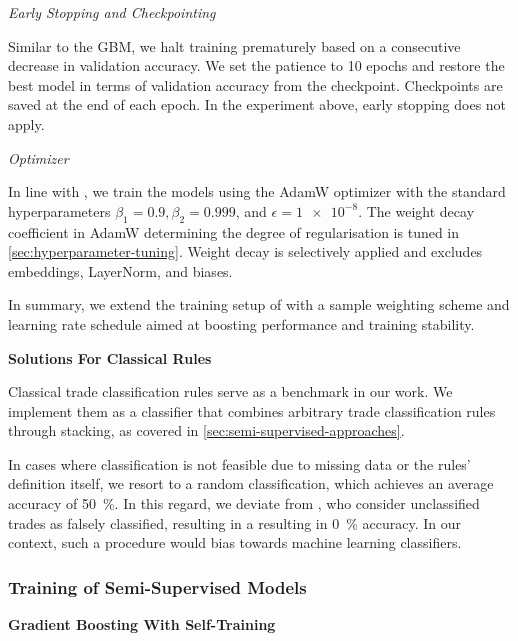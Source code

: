 \emph{Early Stopping and Checkpointing}

Similar to the \gls{GBM}, we halt training prematurely based on a consecutive decrease in validation accuracy. We set the patience to \num{10} epochs and restore the best model in terms of validation accuracy from the checkpoint. Checkpoints are saved at the end of each epoch. In the experiment above, early stopping does not apply.

\emph{Optimizer}

In line with \textcite[][6]{gorishniyRevisitingDeepLearning2021}, we train the models using the AdamW optimizer \autocite[][2--3]{loshchilovDecoupledWeightDecay2019} with the standard hyperparameters $\beta_{1}=0.9, \beta_{2}=0.999$, and $\epsilon = \num{1e-8}$. The weight decay coefficient in AdamW determining the degree of regularisation is tuned in \cref{sec:hyperparameter-tuning}. Weight decay is selectively applied and excludes embeddings, LayerNorm, and biases.

In summary, we extend the training setup of \textcite[][6]{gorishniyRevisitingDeepLearning2021} with a sample weighting scheme and learning rate schedule aimed at boosting performance and training stability.

\textbf{Solutions For Classical Rules}

Classical trade classification rules serve as a benchmark in our work. We implement them as a classifier that combines arbitrary trade classification rules through stacking, as covered in \cref{sec:semi-supervised-approaches}.

In cases where classification is not feasible due to missing data or the rules' definition itself, we resort to a random classification, which achieves an average accuracy of \SI{50}{\percent}. In this regard, we deviate from \textcite[][29--32]{grauerOptionTradeClassification2022}, who consider unclassified trades as falsely classified, resulting in a resulting in \SI{0}{\percent} accuracy. In our context, such a procedure would bias towards machine learning classifiers.

\subsubsection{Training of Semi-Supervised
    Models}\label{sec:training-of-semi-supervised-models}

\textbf{Gradient Boosting With Self-Training}

